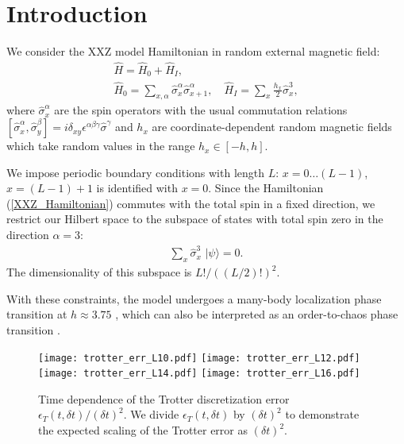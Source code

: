 \documentclass[10pt,amsmath,amssymb,twocolumn,superscriptaddress,groupedaddress,nofootinbib,aps,prd,twocolumn]{revtex4-2}
\newcommand{\lr}[1]{\left(#1\right)}
\newcommand{\lrs}[1]{\left[#1\right]}
\newcommand{\ket}[1]{ \, | #1 \rangle }
\begin{document}
\sloppy

\section{Introduction}
\label{sec:intro}

We consider the XXZ model Hamiltonian in random external magnetic field:
\begin{eqnarray}
\label{XXZ_Hamiltonian}
 \hat{H} = \hat{H}_0 + \hat{H}_I,
 \nonumber \\
 \hat{H}_0 = \sum\limits_{x,\alpha} \hat{\sigma}^{\alpha}_x \hat{\sigma}^{\alpha}_{x+1} ,
 \quad
 \hat{H}_I = \sum\limits_x \frac{h_x}{2} \hat{\sigma}^3_x ,
\end{eqnarray}
where $\hat{\sigma}^{\alpha}_x$ are the spin operators with the usual commutation relations $\lrs{\hat{\sigma}^{\alpha}_x, \hat{\sigma}^{\beta}_y} = i \delta_{x y} \epsilon^{\alpha\beta\gamma} \hat{\sigma}^{\gamma}$ and $h_x$ are coordinate-dependent random magnetic fields which take random values in the range $h_x \in \lrs{-h, h}$.

We impose periodic boundary conditions with length $L$: $x = 0 \ldots \lr{L-1}$, $x = \lr{L-1}+1$ is identified with $x = 0$. Since the Hamiltonian (\ref{XXZ_Hamiltonian}) commutes with the total spin in a fixed direction, we restrict our Hilbert space to the subspace of states with total spin zero in the direction $\alpha = 3$:
\begin{eqnarray}
\label{spin0_constraint}
 \sum\limits_{x} \hat{\sigma}^3_x \, \ket{\psi} = 0 .
\end{eqnarray}
The dimensionality of this subspace is $L!/\lr{\lr{L/2}!}^2$.

With these constraints, the model undergoes a many-body localization phase transition at $h \approx 3.75$ \cite{Luitz:1411.0660}, which can also be interpreted as an order-to-chaos phase transition \cite{Hanada:1803.08050}.

\begin{figure*}[h!pb]
  \centering
  \texttt{[image: trotter\_err\_L10.pdf]}
  \texttt{[image: trotter\_err\_L12.pdf]}\\
  \texttt{[image: trotter\_err\_L14.pdf]}
  \texttt{[image: trotter\_err\_L16.pdf]}\\
  \caption{Time dependence of the Trotter discretization error $\epsilon_T\lr{t, {\delta t}}/\lr{\delta t}^2$. We divide $\epsilon_T\lr{t, {\delta t}}$ by $\lr{\delta t}^2$ to demonstrate the expected scaling of the Trotter error as $\lr{\delta t}^2$.}
  \label{fig:trotter_err}
\end{figure*}
\end{document}
